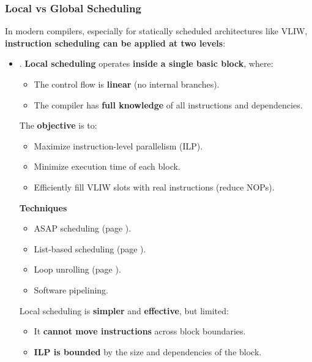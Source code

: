 \subsubsection{Local vs Global Scheduling}

In modern compilers, especially for statically scheduled architectures like VLIW, \textbf{instruction scheduling can be applied at two levels}:
\begin{itemize}
    \item {}. \textbf{Local scheduling} operates \textbf{inside a single basic block}, where:
    \begin{itemize}
        \item The control flow is \textbf{linear} (no internal branches).
        \item The compiler has \textbf{full knowledge} of all instructions and dependencies.
    \end{itemize}
    \textcolor{Green3}{} The \textcolor{Green3}{\textbf{objective}} is to:
    \begin{itemize}
        \item Maximize instruction-level parallelism (ILP).
        \item Minimize execution time of each block.
        \item Efficiently fill VLIW slots with real instructions (reduce NOPs).
    \end{itemize}
    \textcolor{Green3}{ \textbf{Techniques}}
    \begin{itemize}
        \item ASAP scheduling (page \pageref{subsubsection: ASAP Scheduling Algorithm}).
        \item List-based scheduling (page \pageref{subsubsection: List-Based Scheduling Algorithm}).
        \item Loop unrolling (page \pageref{paragraph: Loop Unrolling}).
        \item Software pipelining.
    \end{itemize}
    Local scheduling is \textbf{simpler} and \textbf{effective}, but limited:
    \begin{itemize}[label=\textcolor{Red2}{}]
        \item It \textbf{cannot move instructions} across block boundaries.
        \item \textbf{ILP is bounded} by the size and dependencies of the block.
    \end{itemize}



\end{itemize}

